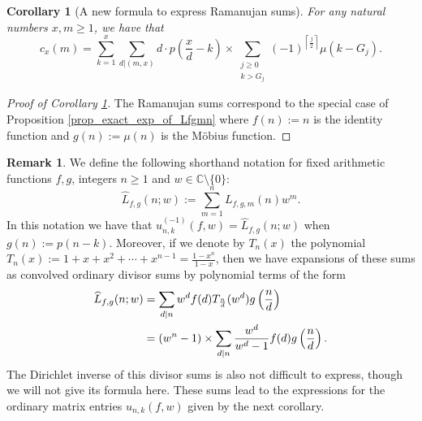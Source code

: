 \documentclass[12pt,reqno,a4letter]{article}
\numberwithin{figure}{section}
\numberwithin{table}{section}
\numberwithin{equation}{section}
\newcommand{\ceiling}[1]{\left\lceil #1 \right\rceil}
\theoremstyle{plain}
\newtheorem{cor}[theorem]{Corollary}
\numberwithin{theorem}{section}
\theoremstyle{definition}
\newtheorem{remark}[theorem]{Remark}
\begin{document}
\begin{cor}[A new formula to express Ramanujan sums]
\label{cor_RamSumNewFormula} 
For any natural numbers $x,m \geq 1$, we have that 
\[
c_x(m) = \sum_{k=1}^x \sum_{d|(m,x)} d \cdot p\left(\frac{x}{d}-k\right) \times 
     \sum_{\substack{j \geq 0 \\ k > G_j}} (-1)^{\ceiling{\frac{j}{2}}} 
     \mu\left(k-G_j\right). 
\] 
\end{cor}
\begin{proof}[Proof of Corollary \ref{cor_RamSumNewFormula}]
The Ramanujan sums correspond to the special case of 
Proposition \ref{prop_exact_exp_of_Lfgmn} 
where $f(n) := n$ is the identity function and $g(n) := \mu(n)$ is the 
M\"obius function. 
\end{proof} 

\begin{remark} 
We define the following shorthand notation for fixed arithmetic functions $f,g$, 
integers $n \geq 1$ and $w \in \mathbb{C} \setminus \{0\}$: 
\begin{equation*} 
\widehat{L}_{f,g}(n; w) := \sum_{m=1}^{n} L_{f,g,m}(n) w^m. 
\end{equation*}
In this notation we have that $u_{n,k}^{(-1)}(f, w) = \widehat{L}_{f,g}(n; w)$ when 
$g(n) := p(n-k)$. 
Moreover, if we denote by $T_n(x)$ the polynomial 
$T_n(x) := 1+x+x^2+\cdots+x^{n-1} = \frac{1-x^n}{1-x}$, 
then we have expansions of these sums as convolved ordinary divisor sums by 
polynomial terms of the form 
\begin{align}
\label{eqn_lfgnw_sum_divsum_exp_v1} 
\widehat{L}_{f,g}(n; w) & = \sum_{d|n} w^d f(d) T_{\frac{n}{d}}(w^d) 
     g\left(\frac{n}{d}\right) \\ 
\notag 
     & = (w^n-1) \times \sum_{d|n} \frac{w^d}{w^d-1} f(d) g\left(\frac{n}{d}\right). 
\end{align} 
The Dirichlet inverse of this divisor sums is also not difficult to express, though 
we will not give its formula here. 
These sums lead to the expressions for the 
ordinary matrix entries $u_{n,k}(f, w)$ given by the next corollary. 
\end{remark} 
\end{document}
